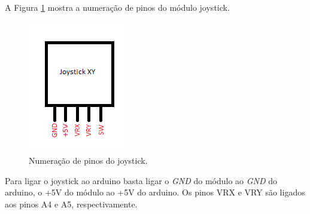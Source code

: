 \documentclass[12pt]{article}
\begin{document}
A Figura \ref{figPinosJoystick} mostra a numeração de pinos do módulo joystick.

\begin{figure}[H]
	\centering
	\includegraphics[scale=0.7]{Imagens/Experimentos/5-LEDMatrix/pinosJoy.png}
	\caption{Numeração de pinos do joystick.}
	\label{figPinosJoystick}
\end{figure}

Para ligar o joystick ao arduino basta ligar o \textit{GND} do módulo ao \textit{GND} do arduino, o +5V do módulo ao +5V do arduino. Os pinos VRX e VRY são ligados aos pinos A4 e A5, respectivamente.



\end{document}
